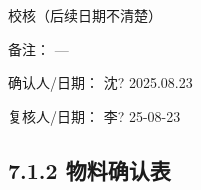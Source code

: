 \documentclass[UTF8,10pt,a4paper,fontset=fandol]{ctexart}
\newcommand{\fieldvalue}[1]{#1}
\newcommand{\handwritten}[1]{#1}
\begin{document}
\handwritten{校核（后续日期不清楚）}

\noindent
备注：
\fieldvalue{\handwritten{—}}

\noindent
确认人/日期：
\fieldvalue{\handwritten{沈?}}\quad
\fieldvalue{\handwritten{2025.08.23}}

\hfill
复核人/日期：
\fieldvalue{\handwritten{李?}}\quad
\fieldvalue{\handwritten{25-08-23}}

\subsection*{7.1.2 物料确认表}
\end{document}
